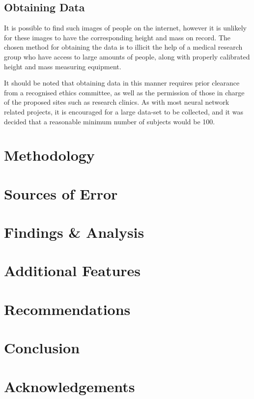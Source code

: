 \documentclass[conference]{IEEEtran}
\begin{document}
\subsection{Obtaining Data}
It is possible to find such images of people on the internet, however it is unlikely for these images to have the corresponding height and mass on record.
The chosen method for obtaining the data is to illicit the help of a medical research group who have access to large amounts of people, along with properly calibrated height and mass measuring equipment.

It should be noted that obtaining data in this manner requires prior clearance from a recognised ethics committee, as well as the permission of those in charge of the proposed sites such as research clinics.
As with most neural network related projects, it is encouraged for a large data-set to be collected, and it was decided that a reasonable minimum number of subjects would be 100.



\section{Methodology}

\section{Sources of Error}

\section{Findings \& Analysis}

\section{Additional Features}

\section{Recommendations}

\section{Conclusion}

\section{Acknowledgements}



\end{document}
